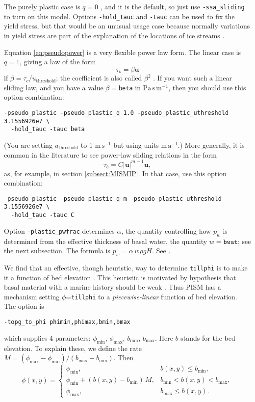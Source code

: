 The purely plastic case is $q=0$ \cite{SchoofStream}, and it is the default, so just use \verb|-ssa_sliding| to turn on this model.  Options \verb|-hold_tauc| and \verb|-tauc| can be used to fix the yield stress, but that would be an unusual usage case because normally variations in yield stress are part of the explanation of the locations of ice streams \cite{SchoofStream}.

Equation \eqref{eq:pseudopower} is a very flexible power law form.  The linear case is $q=1$, giving a law of the form
    $$\tau_b = \beta \mathbf{u}$$
if $\beta=\tau_c/u_{\text{threshold}}$; the coefficient is also called $\beta^2$ \cite{MacAyeal}.  If you want such a linear sliding law, and you have a value $\beta=$\verb|beta| in $\text{Pa}\,\text{s}\,\text{m}^{-1}$, then you should use this option combination:
\begin{verbatim}
-pseudo_plastic -pseudo_plastic_q 1.0 -pseudo_plastic_uthreshold 3.1556926e7 \
  -hold_tauc -tauc beta
\end{verbatim}
\noindent (You are setting $u_{\text{threshold}}$ to 1 $\text{m}\,\text{s}^{-1}$ but using units $\text{m}\,\text{a}^{-1}$.)  More generally, it is common in the literature to see power-law sliding relations in the form
    $$\tau_b = C |\mathbf{u}|^{m-1} \mathbf{u},$$
as, for example, in section \ref{subsect:MISMIP}.  In that case, use this option combination:
\begin{verbatim}
-pseudo_plastic -pseudo_plastic_q m -pseudo_plastic_uthreshold 3.1556926e7 \
  -hold_tauc -tauc C
\end{verbatim}

Option \texttt{-plastic_pwfrac} determines $\alpha$, the quantity controlling how $p_w$ is determined from the effective thickness of basal water, the quantity $w=\mathtt{bwat}$; see the next subsection.  The formula is $p_w = \alpha\, w \rho g H$.  See \cite{BKAJS}.

We find that an effective, though heuristic, way to determine \texttt{tillphi} is to make it a function of bed elevation \cite{BKAJS}.  This heuristic is motivated by hypothesis that basal material with a marine history should be weak \cite{HuybrechtsdeWolde}.  Thus PISM has a mechanism setting $\phi$=\texttt{tillphi} to a \emph{piecewise-linear} function of bed elevation.  The option is
\begin{verbatim}
-topg_to_phi phimin,phimax,bmin,bmax
\end{verbatim}
which supplies 4 parameters: $\phi_{\mathrm{min}}$, $\phi_{\mathrm{max}}$, $b_{\mathrm{min}}$, $b_{\mathrm{max}}$.  Here $b$ stands for the bed elevation.  To explain these, we define the rate $M = (\phi_{\text{max}} - \phi_{\text{min}}) / (b_{\text{max}} - b_{\text{min}})$.  Then
\begin{equation}
  \phi(x,y) = \begin{cases}
    \phi_{\text{min}}, & b(x,y) \le b_{\text{min}}, \\
    \phi_{\text{min}} + (b(x,y) - b_{\text{min}}) \,M,
    &  b_{\text{min}} < b(x,y) < b_{\text{max}}, \\
    \phi_{\text{max}}, & b_{\text{max}} \le b(x,y). \end{cases}\label{eq:2}
\end{equation}

